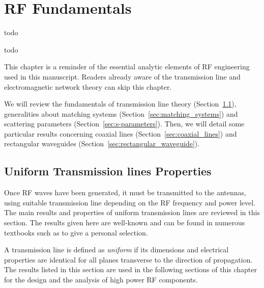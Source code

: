 \chapter{RF Fundamentals}\label{chap:RF_fundamentals}
\margintoc

\epigraph{todo}{todo}

This chapter is a reminder of the essential analytic elements of RF engineering used in this manuscript. Readers already aware of the transmission line and electromagnetic network theory can skip this chapter.

We will review the fundamentals of transmission line theory (Section~\ref{sec:transmission_line}), generalities about matching systems (Section~\ref{sec:matching_systems}) and scattering parameters (Section~\ref{sec:s-parameters}). Then, we will detail some particular results concerning coaxial lines (Section~\ref{sec:coaxial_lines}) and rectangular waveguides (Section~\ref{sec:rectangular_waveguide}). 

\section{Uniform Transmission lines Properties}\label{sec:transmission_line}

Once RF waves have been generated, it must be transmitted to the antennas, using suitable transmission line depending on the RF frequency and power level. The main results and properties of uniform transmission lines are reviewed in this section. The results given here are well-known and can be found in numerous textbooks such as  to give a personal selection.

A transmission line is defined as \textit{uniform} if its dimensions and electrical properties are identical for all planes transverse to the direction of propagation. The results listed in this section are used in the following sections of this chapter for the design and the analysis of high power RF components.

